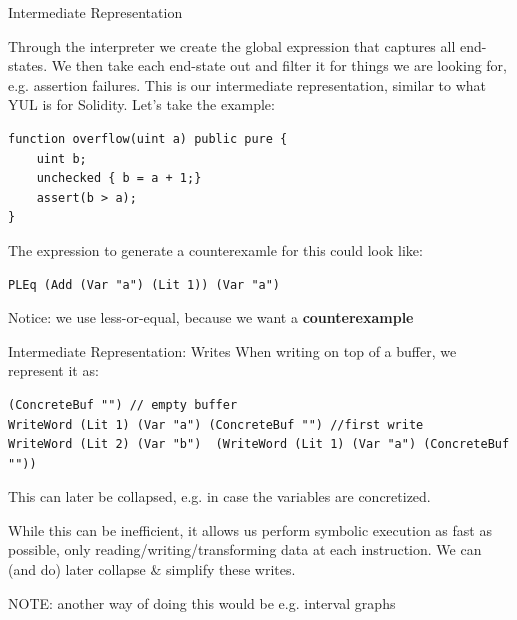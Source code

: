 \documentclass[aspectratio=169]{beamer}
\begin{document}
\begin{frame}[fragile=singleslide]{Intermediate Representation}
\small

Through the interpreter we create the global expression that captures all end-states. We then take each end-state out and filter it for things we are looking for, e.g. assertion failures. This is our intermediate representation, similar to what YUL is for Solidity. Let's take the example:


\begin{Verbatim}[frame=single, framerule=0.2mm,framesep=2mm,fontsize=\small]
function overflow(uint a) public pure {
	uint b;
	unchecked { b = a + 1;}
	assert(b > a);
}
\end{Verbatim}

The expression to generate a counterexamle for this could look like:

\begin{Verbatim}[frame=single, framerule=0.2mm, framesep=2mm,fontsize=\small]
PLEq (Add (Var "a") (Lit 1)) (Var "a")
\end{Verbatim}

Notice: we use less-or-equal, because we want a \textbf{counterexample}
\end{frame}

\begin{frame}[fragile=singleslide]{Intermediate Representation: Writes}
When writing on top of a buffer, we represent it as:

\begin{Verbatim}[frame=single, framerule=0.2mm, framesep=2mm,fontsize=\small]
(ConcreteBuf "") // empty buffer
WriteWord (Lit 1) (Var "a") (ConcreteBuf "") //first write
WriteWord (Lit 2) (Var "b")  (WriteWord (Lit 1) (Var "a") (ConcreteBuf ""))
\end{Verbatim}
This can later be collapsed, e.g. in case the variables are concretized.
\bigskip

While this can be inefficient, it allows us perform symbolic execution as fast as possible, only reading/writing/transforming data at each instruction. We can (and do) later collapse \& simplify these writes.
\bigskip

NOTE: another way of doing this would be e.g. interval graphs
\end{frame}
\end{document}
